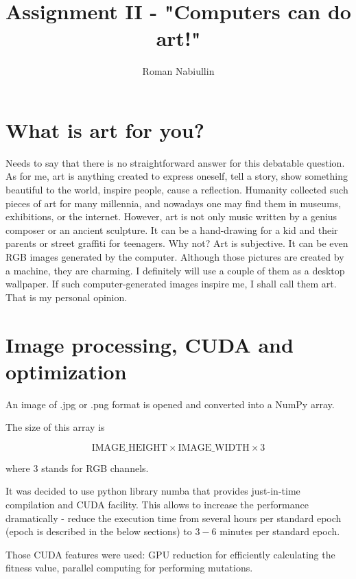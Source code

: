 \documentclass[letterpaper, 16pt]{article}
\title{Assignment II - "Computers can do art!"}
\author{Roman Nabiullin}
\date{}
\newcommand{\vbreak}{\vspace{4mm}}
\begin{document}
\maketitle

\section{What is art for you?}

Needs to say that there is no straightforward answer for this debatable question. As for me, art is anything created to express oneself, tell a story, show something beautiful to the world, inspire people, cause a reflection. Humanity collected such pieces of art for many millennia, and nowadays one may find them in museums, exhibitions, or the internet. However, art is not only music written by a genius composer or an ancient sculpture. It can be a hand-drawing for a kid and their parents or street graffiti for teenagers. Why not? Art is subjective. It can be even RGB images generated by the computer. Although those pictures are created by a machine, they are charming. I definitely will use a couple of them as a desktop wallpaper. If such computer-generated images inspire me, I shall call them art. That is my personal opinion.

\section{Image processing, CUDA and optimization}

An image of .jpg or .png format is opened and converted into a NumPy array. 

\vbreak

The size of this array is 

$$\text{IMAGE\_HEIGHT} \times \text{IMAGE\_WIDTH} \times 3$$

where $3$ stands for RGB channels.

\vbreak

It was decided to use python library numba that provides just-in-time compilation and CUDA facility. This allows to increase the performance dramatically - reduce the execution time from several hours per standard epoch (epoch is described in the below sections) to $3-6$ minutes per standard epoch.

\vbreak

Those CUDA features were used: GPU reduction for efficiently calculating the fitness value, parallel computing for performing mutations. 
\end{document}

